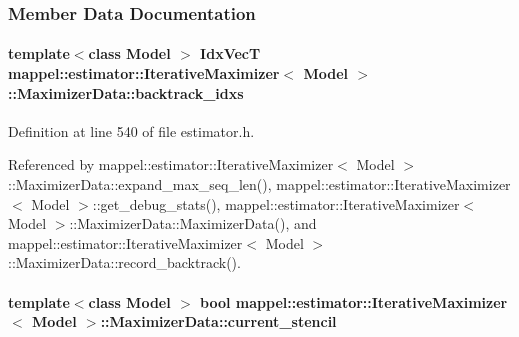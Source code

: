 \subsubsection{Member Data Documentation}
\paragraph[{\texorpdfstring{backtrack\+\_\+idxs}{backtrack_idxs}}]{\setlength{\rightskip}{0pt plus 5cm}template$<$class Model $>$ {\bf Idx\+VecT} {\bf mappel\+::estimator\+::\+Iterative\+Maximizer}$<$ Model $>$\+::Maximizer\+Data\+::backtrack\+\_\+idxs\hspace{0.3cm}{\ttfamily [protected]}}\hypertarget{classmappel_1_1estimator_1_1IterativeMaximizer_1_1MaximizerData_aa2e5e2e70dab82632a02aedfdb11f3fd}{}\label{classmappel_1_1estimator_1_1IterativeMaximizer_1_1MaximizerData_aa2e5e2e70dab82632a02aedfdb11f3fd}


Definition at line 540 of file estimator.\+h.



Referenced by mappel\+::estimator\+::\+Iterative\+Maximizer$<$ Model $>$\+::\+Maximizer\+Data\+::expand\+\_\+max\+\_\+seq\+\_\+len(), mappel\+::estimator\+::\+Iterative\+Maximizer$<$ Model $>$\+::get\+\_\+debug\+\_\+stats(), mappel\+::estimator\+::\+Iterative\+Maximizer$<$ Model $>$\+::\+Maximizer\+Data\+::\+Maximizer\+Data(), and mappel\+::estimator\+::\+Iterative\+Maximizer$<$ Model $>$\+::\+Maximizer\+Data\+::record\+\_\+backtrack().

\paragraph[{\texorpdfstring{current\+\_\+stencil}{current_stencil}}]{\setlength{\rightskip}{0pt plus 5cm}template$<$class Model $>$ bool {\bf mappel\+::estimator\+::\+Iterative\+Maximizer}$<$ Model $>$\+::Maximizer\+Data\+::current\+\_\+stencil\hspace{0.3cm}{\ttfamily [protected]}}\hypertarget{classmappel_1_1estimator_1_1IterativeMaximizer_1_1MaximizerData_a0f5328ef64b11fd94af32cc664efc4e4}{}\label{classmappel_1_1estimator_1_1IterativeMaximizer_1_1MaximizerData_a0f5328ef64b11fd94af32cc664efc4e4}


